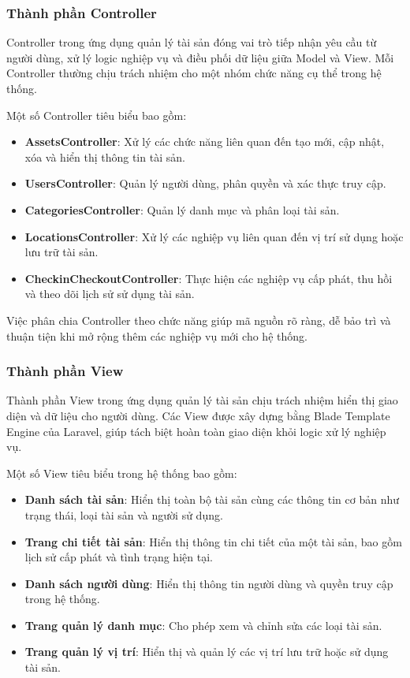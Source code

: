 \documentclass[../DoAn.tex]{subfiles}
\begin{document}
\subsubsection{Thành phần Controller}

Controller trong ứng dụng quản lý tài sản đóng vai trò tiếp nhận yêu cầu từ người dùng, xử lý logic nghiệp vụ
và điều phối dữ liệu giữa Model và View. Mỗi Controller thường chịu trách nhiệm cho một nhóm
chức năng cụ thể trong hệ thống.

Một số Controller tiêu biểu bao gồm:
\begin{itemize}
    \item \textbf{AssetsController}: Xử lý các chức năng liên quan đến tạo mới, cập nhật,
    xóa và hiển thị thông tin tài sản.
    \item \textbf{UsersController}: Quản lý người dùng, phân quyền và xác thực truy cập.
    \item \textbf{CategoriesController}: Quản lý danh mục và phân loại tài sản.
    \item \textbf{LocationsController}: Xử lý các nghiệp vụ liên quan đến vị trí sử dụng
    hoặc lưu trữ tài sản.
    \item \textbf{CheckinCheckoutController}: Thực hiện các nghiệp vụ cấp phát, thu hồi
    và theo dõi lịch sử sử dụng tài sản.
\end{itemize}

Việc phân chia Controller theo chức năng giúp mã nguồn rõ ràng, dễ bảo trì và thuận tiện
khi mở rộng thêm các nghiệp vụ mới cho hệ thống.

\subsubsection{Thành phần View}

Thành phần View trong ứng dụng quản lý tài sản chịu trách nhiệm hiển thị giao diện và dữ liệu cho người dùng.
Các View được xây dựng bằng Blade Template Engine của Laravel, giúp tách biệt hoàn toàn
giao diện khỏi logic xử lý nghiệp vụ.

Một số View tiêu biểu trong hệ thống bao gồm:
\begin{itemize}
    \item \textbf{Danh sách tài sản}: Hiển thị toàn bộ tài sản cùng các thông tin cơ bản
    như trạng thái, loại tài sản và người sử dụng.
    \item \textbf{Trang chi tiết tài sản}: Hiển thị thông tin chi tiết của một tài sản,
    bao gồm lịch sử cấp phát và tình trạng hiện tại.
    \item \textbf{Danh sách người dùng}: Hiển thị thông tin người dùng và quyền truy cập
    trong hệ thống.
    \item \textbf{Trang quản lý danh mục}: Cho phép xem và chỉnh sửa các loại tài sản.
    \item \textbf{Trang quản lý vị trí}: Hiển thị và quản lý các vị trí lưu trữ hoặc sử dụng
    tài sản.
\end{itemize}
\end{document}
